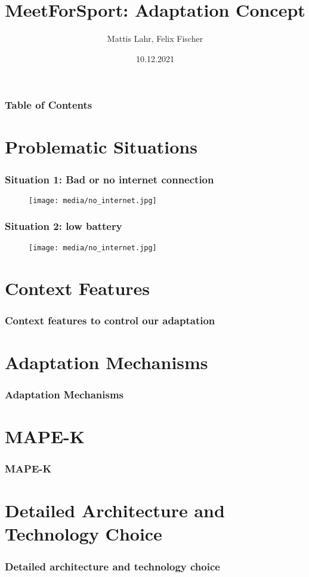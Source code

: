 \documentclass[aspectratio=169]{beamer}
\title{MeetForSport: Adaptation Concept}
\author{Mattis Lahr, Felix Fischer}
\date{10.12.2021}
\begin{document}
\maketitle



\begin{frame}
    \frametitle{Table of Contents}
    \tableofcontents
\end{frame}




\section{Problematic Situations}
\begin{frame}   
	\frametitle{Situation 1:  Bad or no internet connection}
	 \begin{figure}
		\centering
		\texttt{[image: media/no\_internet.jpg]}
	\end{figure}
\end{frame}
\begin{frame}   
	\frametitle{Situation 2: low battery}
	 \begin{figure}
		\centering
		\texttt{[image: media/no\_internet.jpg]}
	\end{figure}
\end{frame}




\section{Context Features}
\begin{frame}   
	\frametitle{Context features to control our adaptation}
\end{frame}




\section{Adaptation Mechanisms}
\begin{frame}   
	\frametitle{Adaptation Mechanisms}
\end{frame}




\section{MAPE-K}
\begin{frame}   
	\frametitle{MAPE-K}
\end{frame}




\section{Detailed Architecture and Technology Choice}
\begin{frame}
	\frametitle{Detailed architecture and technology choice}
\end{frame}
\end{document}
